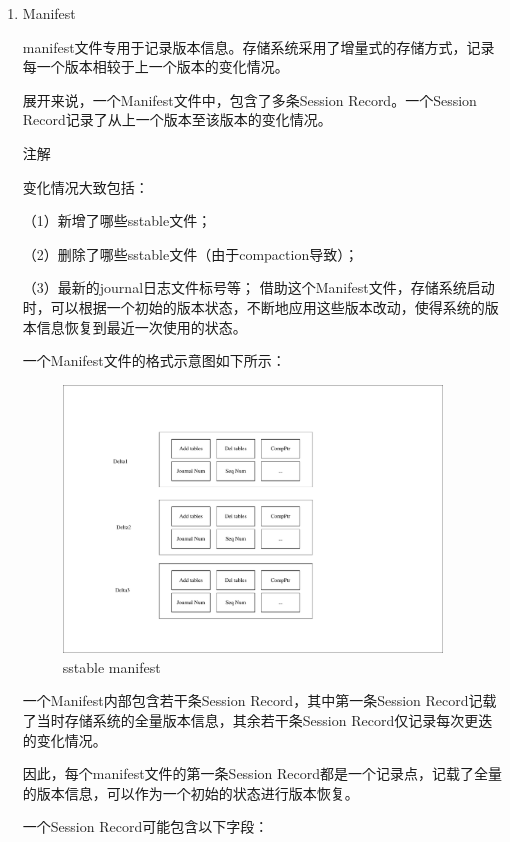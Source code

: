 		\begin{enumerate}
		
		\item Manifest

manifest文件专用于记录版本信息。存储系统采用了增量式的存储方式，记录每一个版本相较于上一个版本的变化情况。

展开来说，一个Manifest文件中，包含了多条Session Record。一个Session Record记录了从上一个版本至该版本的变化情况。

注解

变化情况大致包括：

（1）新增了哪些sstable文件；

（2）删除了哪些sstable文件（由于compaction导致）；

（3）最新的journal日志文件标号等；
借助这个Manifest文件，存储系统启动时，可以根据一个初始的版本状态，不断地应用这些版本改动，使得系统的版本信息恢复到最近一次使用的状态。

一个Manifest文件的格式示意图如下所示：
			
\begin{figure}[H]
	\centering
	\includegraphics[width=0.95\textwidth]{pdf/manifest.pdf}
	\caption{sstable manifest}
	\label{sstable_manifest}
\end{figure}
			

一个Manifest内部包含若干条Session Record，其中第一条Session Record记载了当时存储系统的全量版本信息，其余若干条Session Record仅记录每次更迭的变化情况。

因此，每个manifest文件的第一条Session Record都是一个记录点，记载了全量的版本信息，可以作为一个初始的状态进行版本恢复。

一个Session Record可能包含以下字段：


\end{enumerate}
